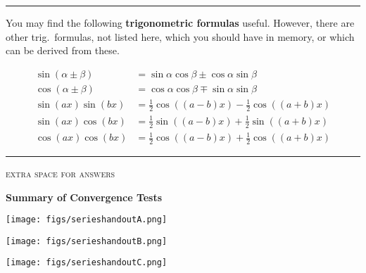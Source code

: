\documentclass[11pt]{amsart}
\begin{document}
\noindent \hrule
\small
\bigskip
\noindent You may find the following \textbf{trigonometric formulas} useful.  However, there are other trig.~formulas, not listed here, which you should have in memory, or which can be derived from these.

\begin{align*}
\sin(\alpha \pm \beta) &= \sin \alpha \cos \beta \pm \cos \alpha \sin \beta \\
\cos(\alpha \pm \beta) &= \cos \alpha \cos \beta \mp \sin \alpha \sin \beta \\
\sin(ax) \sin(bx) &= \frac{1}{2} \cos((a-b)x) - \frac{1}{2} \cos((a+b)x) \\
\sin(ax) \cos(bx) &= \frac{1}{2} \sin((a-b)x) + \frac{1}{2} \sin((a+b)x) \\
\cos(ax) \cos(bx) &= \frac{1}{2} \cos((a-b)x) + \frac{1}{2} \cos((a+b)x)
\end{align*}

\bigskip
\noindent \hrule
\small
\medskip
\centerline{\footnotesize \textsc{extra space for answers}}
\vspace{2.5in}


\clearpage\newpage
\large\centerline{\textbf{Summary of Convergence Tests}}
\normalsize

\begin{center}
\texttt{[image: figs/serieshandoutA.png]}
\end{center}
\vfill


\clearpage\newpage
\begin{center}
\texttt{[image: figs/serieshandoutB.png]}

\vspace{-2mm}
\texttt{[image: figs/serieshandoutC.png]}
\end{center}
\vfill
\end{document}
